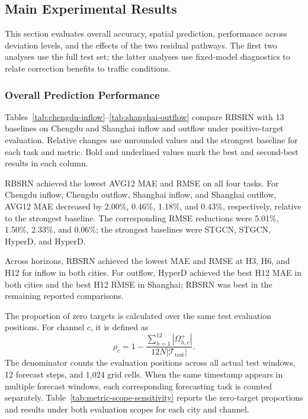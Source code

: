 \subsection{Main Experimental Results}\label{sec:exp-main-results}

This section evaluates overall accuracy, spatial prediction, performance across deviation levels, and the effects of the two residual pathways. The first two analyses use the full test set; the latter analyses use fixed-model diagnostics to relate correction benefits to traffic conditions.

\subsubsection{Overall Prediction Performance}\label{sec:results-overall}

Tables~\ref{tab:chengdu-inflow}--\ref{tab:shanghai-outflow} compare RBSRN with 13 baselines on Chengdu and Shanghai inflow and outflow under positive-target evaluation. Relative changes use unrounded values and the strongest baseline for each task and metric. Bold and underlined values mark the best and second-best results in each column.

RBSRN achieved the lowest AVG12 MAE and RMSE on all four tasks. For Chengdu inflow, Chengdu outflow, Shanghai inflow, and Shanghai outflow, AVG12 MAE decreased by 2.00\%, 0.46\%, 1.18\%, and 0.43\%, respectively, relative to the strongest baseline. The corresponding RMSE reductions were 5.01\%, 1.50\%, 2.33\%, and 0.06\%; the strongest baselines were STGCN, STGCN, HyperD, and HyperD.

Across horizons, RBSRN achieved the lowest MAE and RMSE at H3, H6, and H12 for inflow in both cities. For outflow, HyperD achieved the best H12 MAE in both cities and the best H12 RMSE in Shanghai; RBSRN was best in the remaining reported comparisons.






The proportion of zero targets is calculated over the same test evaluation positions. For channel \(c\), it is defined as
\begin{equation}
	\rho_c=1-\frac{\sum_{h=1}^{12}|\Omega^{+}_{h,c}|}
	{12N|\mathcal{T}_{\mathrm{test}}|}.
	\label{eq:zero-target-proportion}
\end{equation}
The denominator counts the evaluation positions across all actual test windows, 12 forecast steps, and 1,024 grid cells. When the same timestamp appears in multiple forecast windows, each corresponding forecasting task is counted separately. Table~\ref{tab:metric-scope-sensitivity} reports the zero-target proportions and results under both evaluation scopes for each city and channel.

